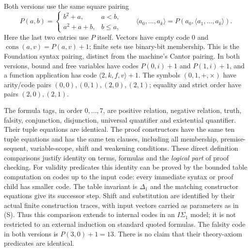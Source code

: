 Both versions use the same square pairing
\[
 P(a,b)=
 \begin{cases}
   b^2+a,&a<b,\\
   a^2+a+b,&b\le a,
 \end{cases}
 \qquad
 \langle a_0,\ldots,a_k\rangle
   =P(a_0,\langle a_1,\ldots,a_k\rangle).
\]
Here the last two entries use $P$ itself.  Vectors have empty code $0$
and $\operatorname{cons}(a,v)=P(a,v)+1$; finite sets use binary-bit
membership.  This is the Foundation syntax pairing, distinct from
the machine's Cantor pairing.  In both versions, bound and free
variables have codes $P(0,i)+1$ and $P(1,i)+1$, and a function application
has code $\langle2,k,f,v\rangle+1$.
The symbols $(0,1,+,\times)$ have arity/code pairs
$(0,0),(0,1),(2,0),(2,1)$; equality and strict order have
pairs $(2,0),(2,1)$.

The formula tags, in order $0,\ldots,7$, are positive relation, negative
relation, truth, falsity, conjunction, disjunction, universal quantifier
and existential quantifier.  Their tuple equations are identical.
The proof constructors have the same ten tuple equations and
 has the same ten clauses, including all
membership, premise-sequent, variable-scope, shift and weakening
conditions.  These direct definition comparisons justify identity on
terms, formulas and the \emph{logical part} of proof checking.
For validity predicates this identity can be proved by the bounded
table computation on codes up to the input code: every immediate
syntax or proof child has smaller code.  The table invariant is
$\Delta_1$ and the matching constructor equations give its successor
step.  Shift and substitution are identified by their actual finite
construction traces, with input vectors carried as parameters as in
(S).  Thus this comparison extends to internal codes in an
$I\Sigma_1$ model; it is not restricted to an external induction on
standard quoted formulas.
The falsity code in both versions is $P(3,0)+1=13$.
There is no claim that their theory-axiom predicates are identical.

